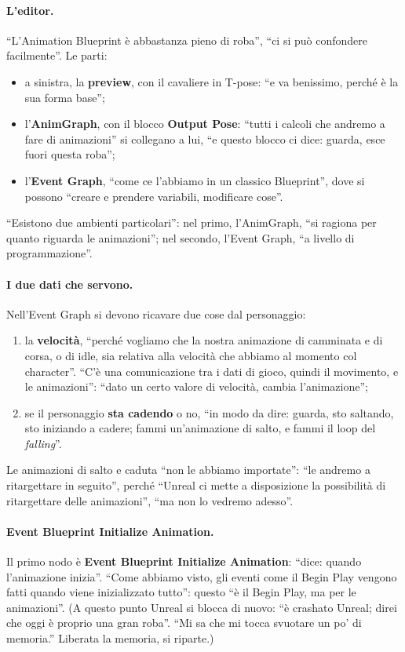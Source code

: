 \paragraph{L'editor.} ``L'Animation Blueprint è abbastanza pieno di roba'', ``ci si può
confondere facilmente''. Le parti:
\begin{itemize}
  \item a sinistra, la \textbf{preview}, con il cavaliere in T-pose: ``e va benissimo,
        perché è la sua forma base'';
  \item l'\textbf{AnimGraph}, con il blocco \textbf{Output Pose}: ``tutti i calcoli che
        andremo a fare di animazioni'' si collegano a lui, ``e questo blocco ci dice:
        guarda, esce fuori questa roba'';
  \item l'\textbf{Event Graph}, ``come ce l'abbiamo in un classico Blueprint'', dove si
        possono ``creare e prendere variabili, modificare cose''.
\end{itemize}
``Esistono due ambienti particolari'': nel primo, l'AnimGraph, ``si ragiona per quanto
riguarda le animazioni''; nel secondo, l'Event Graph, ``a livello di programmazione''.

\paragraph{I due dati che servono.} Nell'Event Graph si devono ricavare due cose dal
personaggio:
\begin{enumerate}
  \item la \textbf{velocità}, ``perché vogliamo che la nostra animazione di camminata e
        di corsa, o di idle, sia relativa alla velocità che abbiamo al momento col
        character''. ``C'è una comunicazione tra i dati di gioco, quindi il movimento, e
        le animazioni'': ``dato un certo valore di velocità, cambia l'animazione'';
  \item se il personaggio \textbf{sta cadendo} o no, ``in modo da dire: guarda, sto
        saltando, sto iniziando a cadere; fammi un'animazione di salto, e fammi il loop
        del \emph{falling}''.
\end{enumerate}
Le animazioni di salto e caduta ``non le abbiamo importate'': ``le andremo a
ritargettare in seguito'', perché ``Unreal ci mette a disposizione la possibilità di
ritargettare delle animazioni'', ``ma non lo vedremo adesso''.

\paragraph{Event Blueprint Initialize Animation.} Il primo nodo è \textbf{Event Blueprint
Initialize Animation}: ``dice: quando l'animazione inizia''. ``Come abbiamo visto, gli
eventi come il Begin Play vengono fatti quando viene inizializzato tutto'': questo ``è il
Begin Play, ma per le animazioni''. (A questo punto Unreal si blocca di nuovo:
``è crashato Unreal; direi che oggi è proprio una gran roba''. ``Mi sa che mi tocca
svuotare un po' di memoria.'' Liberata la memoria, si riparte.)

